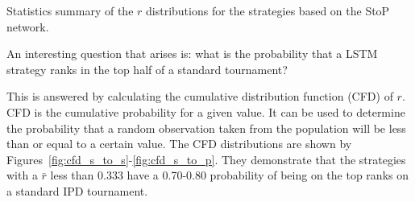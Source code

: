 \begin{table}[!htbp]
    \begin{center}
    \resizebox{.9\textwidth}{!}{
        
    }
\end{center}
\caption{Statistics summary of the \(r\) distributions for the strategies
based on the StoP network.}\label{table:statistic_summary_s_to_p}
\end{table}

\newpage

An interesting question that arises is: what is the probability that a LSTM
strategy ranks in the top half of a standard tournament?

This is answered by calculating the cumulative distribution function (CFD) of
\(r\). CFD is the cumulative probability for a given value. It can be used to
determine the probability that a random observation taken from the population
will be less than or equal to a certain value. The CFD distributions are shown by
Figures~\ref{fig:cfd_s_to_s}-\ref{fig:cfd_s_to_p}. They demonstrate that the
strategies with a \(\bar{r}\) less than 0.333 have a 0.70-0.80 probability of
being on the top ranks on a standard IPD tournament.

